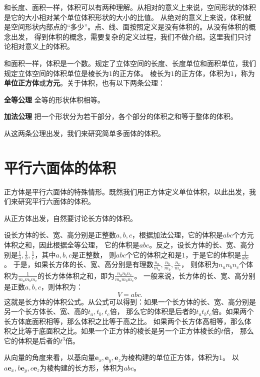 \documentclass[12pt,UTF8]{ctexbook}
\begin{document}
和长度、面积一样，体积可以有两种理解。从相对的意义上来说，空间形状的体积是它的大小相对某个单位体积形状的大小的比值。
从绝对的意义上来说，体积就是空间形状内部点的“多少”。点、线、面按照定义是没有体积的。从没有体积的概念出发，
得到体积的概念，需要复杂的定义过程，我们不做介绍。这里我们只讨论相对意义上的体积。

和面积一样，体积是一个数。规定了立体空间的长度、长度单位和面积单位，我们规定立体空间的体积单位是棱长为$1$的正方体。
棱长为$1$的正方体，体积为$1$，称为\textbf{单位正方体}或\textbf{方元}。关于体积，也有以下两条公理：
\begin{po}{\textbf{全等公理}}\label{po:4}
    全等的形状体积相等。
\end{po}
\begin{po}{\textbf{加法公理}}\label{po:5}
    把一个形状分为若干部分，各个部分的体积之和等于整体的体积。
\end{po}
从这两条公理出发，我们来研究简单多面体的体积。

\section{平行六面体的体积}

正方体是平行六面体的特殊情形。既然我们用正方体定义单位体积，以此出发，我们来研究平行六面体的体积。

从正方体出发，自然要讨论长方体的体积。

设长方体的长、宽、高分别是正整数$a,b,c$，根据加法公理，它的体积是$abc$个方元体积之和，因此根据全等公理，
它的体积是$abc$。反之，设长方体的长、宽、高分别是$\frac{1}{a},\frac{1}{b},\frac{1}{c}$，其中$a,b,c$是正整数，
则$abc$个它的体积之和是$1$，于是它的体积是$\frac{1}{abc}$。
于是，如果长方体的长、宽、高分别是有理数$\frac{n_a}{m_a},\frac{n_b}{m_b},\frac{n_c}{m_c}$，
则体积为$n_an_bn_c$个体积为$\frac{1}{m_am_bm_c}$的长方体体积之和，即为$\frac{n_an_bn_c}{m_am_bm_c}$。
一般来说，长方体的长、宽、高分别是正数$a,b,c$，则体积为：
$$ V = abc.$$
这就是长方体的体积公式。从公式可以得到：如果一个长方体的长、宽、高分别是另一个长方体长、宽、高的$t_a,t_b,t_c$倍，
那么它的体积是后者的$t_at_bt_c$倍。如果两个长方体底面积相等，那么体积之比等于高之比。
如果两个长方体高相等，那么体积之比等于底面积之比。如果一个正方体的棱长是另一个正方体棱长的$t$倍，
那么它的体积是后者的$t^3$倍。

从向量的角度来看，以基向量$\mathbf{e}_x, \mathbf{e}_y, \mathbf{e}_z$为棱构建的单位正方体，体积为$1$。
以$a\mathbf{e}_x, b\mathbf{e}_y, c\mathbf{e}_z$为棱构建的长方形，体积为$abc$。
\end{document}
